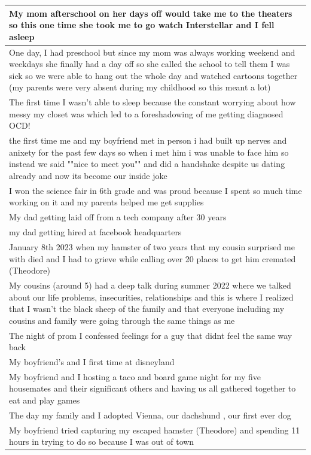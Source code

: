 \documentclass[
  .7em,
  letterpaper,
  DIV=11,
  numbers=noendperiod]{scrartcl}
\begin{document}
\begin{table}
\begin{tabular}{l}
\hline
My mom afterschool on her days off would take me to the theaters so this one time she took me to go watch Interstellar and I fell asleep\\
\hline
One day, I had preschool but since my mom was always working weekend and weekdays she finally had a day off so she called the school to tell them I was sick so we were able to hang out the whole day and watched cartoons together (my parents were very absent during my childhood so this meant a lot)\\
\hline
The first time I wasn't able to sleep because the constant worrying about how messy my closet was which led to a foreshadowing of me getting diagnosed OCD!\\
\hline
the first time me and my boyfriend met in person i had built up nerves and anixety for the past few days so when i met him i was unable to face him so instead we said ""nice to meet you"" and did a handshake despite us dating already and now its become our inside joke\\
\hline
I won the science fair in 6th grade and was proud because I spent so much time working on it and my parents helped me get supplies\\
\hline
My dad getting laid off from a tech company after 30 years\\
\hline
my dad getting hired at facebook headquarters\\
\hline
January 8th 2023 when my hamster of two years that my cousin surprised me with died and I had to grieve while calling over 20 places to get him cremated (Theodore)\\
\hline
My cousins (around 5) had a deep talk during summer 2022 where we talked about our life problems, insecurities, relationships and this is where I realized that I wasn't the black sheep of the family and that everyone including my cousins and family were going through the same things as me\\
\hline
The night of prom I confessed feelings for a guy that didnt feel the same way back\\
\hline
My boyfriend's and I first time at disneyland\\
\hline
My boyfriend and I hosting a taco and board game night for my five housemates and their significant others and having us all gathered together to eat and play games\\
\hline
The day my family and I adopted Vienna, our dachshund , our first ever dog\\
\hline
My boyfriend tried capturing my escaped hamster (Theodore) and spending 11 hours in trying to do so because I was out of town\\

\end{tabular}
\end{table}
\end{document}
